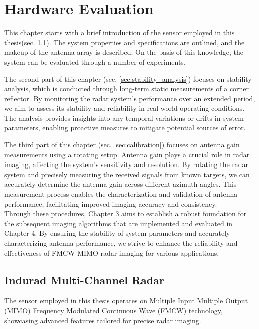 \chapter{Hardware Evaluation}

This chapter starts with a brief introduction of the sensor employed in this thesis(sec. \ref{sec:imcr}).
The system properties and specifications are outlined, and the makeup of the antenna array is described.
On the basis of this knowledge, the system can be evaluated through a number of experiments.

The second part of this chapter (sec. \ref{sec:stability_analysis}) focuses on stability analysis,
which is conducted through long-term static measurements of a corner reflector.
By monitoring the radar system's performance over an extended period,
we aim to assess its stability and reliability in real-world operating conditions.
The analysis provides insights into any temporal variations or drifts in system parameters,
enabling proactive measures to mitigate potential sources of error.

The third part of this chapter (sec. \ref{sec:calibration}) focuses on antenna gain measurements using a rotating setup.
Antenna gain plays a crucial role in radar imaging, affecting the system's sensitivity and resolution.
By rotating the radar system and precisely measuring the received signals from known targets,
we can accurately determine the antenna gain across different azimuth angles.
This measurement process enables the characterization and validation of antenna performance,
facilitating improved imaging accuracy and consistency. \\

Through these procedures, Chapter 3 aims to establish a robust foundation
for the subsequent imaging algorithms that are implemented and evaluated in Chapter 4.
By ensuring the stability of system parameters and accurately characterizing antenna performance,
we strive to enhance the reliability and effectiveness of FMCW MIMO radar imaging for various applications.

\section{Indurad Multi-Channel Radar}
\label{sec:imcr}
The sensor employed in this thesis operates on Multiple Input Multiple Output (MIMO) Frequency Modulated Continuous Wave (FMCW) technology,
showcasing advanced features tailored for precise radar imaging.

